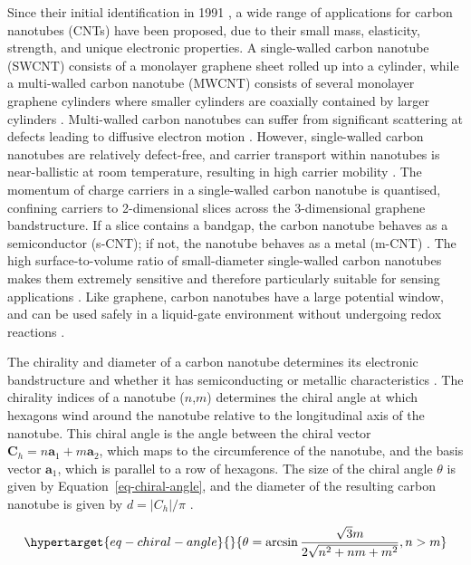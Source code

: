 \documentclass[
  a4paper,
]{scrbook}
\begin{document}
Since their initial identification in 1991 \autocite{Iijima1991}, a wide
range of applications for carbon nanotubes (CNTs) have been proposed,
due to their small mass, elasticity, strength, and unique electronic
properties. A single-walled carbon nanotube (SWCNT) consists of a
monolayer graphene sheet rolled up into a cylinder, while a multi-walled
carbon nanotube (MWCNT) consists of several monolayer graphene cylinders
where smaller cylinders are coaxially contained by larger cylinders
\autocite{Dekker1999,Avouris2007,Cao2009,Rouhi2010,Shkodra2021}.
Multi-walled carbon nanotubes can suffer from significant scattering at
defects leading to diffusive electron motion \autocite{Dekker1999}.
However, single-walled carbon nanotubes are relatively defect-free, and
carrier transport within nanotubes is near-ballistic at room
temperature, resulting in high carrier mobility
\autocite{Dekker1999,Avouris2007,Cao2009,Rouhi2010,Shkodra2021}. The
momentum of charge carriers in a single-walled carbon nanotube is
quantised, confining carriers to 2-dimensional slices across the
3-dimensional graphene bandstructure. If a slice contains a bandgap, the
carbon nanotube behaves as a semiconductor (s-CNT); if not, the nanotube
behaves as a metal (m-CNT) \autocite{McEuen2002}. The high
surface-to-volume ratio of small-diameter single-walled carbon nanotubes
makes them extremely sensitive and therefore particularly suitable for
sensing applications \autocite{Cao2009,Yao2021,Shkodra2021}. Like
graphene, carbon nanotubes have a large potential window, and can be
used safely in a liquid-gate environment without undergoing redox
reactions \autocite{Ohno2015}.

The chirality and diameter of a carbon nanotube determines its
electronic bandstructure and whether it has semiconducting or metallic
characteristics
\autocite{Martel1998,Dekker1999,McEuen2002,Avouris2007,Shkodra2021,Li2023}.
The chirality indices of a nanotube (\(n\),\(m\)) determines the chiral
angle at which hexagons wind around the nanotube relative to the
longitudinal axis of the nanotube. This chiral angle is the angle
between the chiral vector
\(\textbf{C}_h = n\textbf{a}_1+m\textbf{a}_2\), which maps to the
circumference of the nanotube, and the basis vector \(\textbf{a}_1\),
which is parallel to a row of hexagons. The size of the chiral angle
\(\theta\) is given by Equation~\ref{eq-chiral-angle}, and the diameter
of the resulting carbon nanotube is given by \(d=|C_h|/\pi\)
\autocite{Lu2012}.

\begin{equation}\protect\hypertarget{eq-chiral-angle}{}{
\theta = \arcsin\frac{\sqrt{3}m}{2\sqrt{n^2+nm+m^2}}, \space n > m
}\label{eq-chiral-angle}\end{equation}
\end{document}
